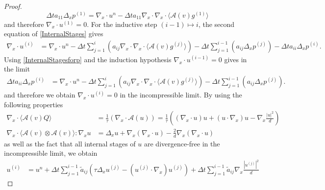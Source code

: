 \documentclass[10pt,a4paper]{amsart}
\begin{document}
\begin{proof}
\begin{equation}
\Delta t a_{11} \Delta_x p^{(1)} =  \nabla_x \cdot u^n - \Delta t  a_{11} \nabla_x \cdot \nabla_x \cdot \langle \mathcal{A}(v) g^{(1)} \rangle
\end{equation}
and therefore $\nabla_x \cdot u^{(1)} = 0$.
For the inductive step $(i-1) \mapsto i$, the second equation of \eqref{InternalStages} gives
\begin{equation}
\begin{split}
\nabla_x \cdot u^{(i)} &= \nabla_x \cdot u^n 
- \Delta t  \sum_{j = 1}^i \left( a_{ij} \nabla_x \cdot \nabla_x \cdot \langle \mathcal{A}(v) g^{(j)} \rangle \right) - \Delta t  \sum_{j = 1}^{i-1} \left( a_{ij} \Delta_x p^{(j)} \right) 
- \Delta t  a_{ii} \Delta_x p^{(i)}.
\end{split}
\end{equation}
Using \eqref{InternalStagesforp} and the induction hypothesis $\nabla_x \cdot u^{(i-1)} = 0$ gives in the limit 
\begin{equation}
\begin{split}
\Delta t a_{ii} \Delta_x p^{(i)}  &= \nabla_x \cdot  u^n - \Delta t  \sum_{j = 1}^i \left( a_{ij} \nabla_x \cdot \nabla_x \cdot \langle \mathcal{A}(v) g^{(j)} \rangle \right) - \Delta t  \sum_{j = 1}^{i-1} \left( a_{ij} \Delta_x p^{(j)} \right).
\end{split}
\end{equation}
and therefore we obtain $\nabla_x \cdot u^{(i)} = 0$ in the incompressible limit.
By using the following properties
\begin{equation*}\begin{split}
\nabla_x \cdot \langle \mathcal{A}(v) Q \rangle &= \frac{1}{\tau}\left( \nabla_x \cdot \mathcal{A}(u)\right) = \frac{1}{\tau} \left((\nabla_x \cdot u) u + (u \cdot \nabla_x) u - \nabla_x \frac{|u|^2}{d} \right)\\
\nabla_x \cdot \langle \mathcal{A}(v) \otimes \mathcal{A}(v) \rangle : \nabla_x u &= \Delta_x u + \nabla_x(\nabla_x \cdot u) - \frac{2}{d} \nabla_x (\nabla_x \cdot u)
\end{split}
\end{equation*}
as well as the fact that all internal stages of $u$ are divergence-free in the incompressible limit, we obtain
\begin{equation}
\begin{split} \label{FinalForu_}
u^{(i)} &= u^n 
+ \Delta t  \sum_{j=1}^{i-1} \tilde{a}_{ij}  \left( \tau \Delta_x u^{(j)} -  (u^{(j)} \cdot \nabla_x ) u^{(j)}\right) 
+ \Delta t  \sum_{j=1}^{i-1} \tilde{a}_{ij} \nabla_x \frac{|u^{(j)}|^2}{d} 

\end{split}
\end{equation}
\end{proof}
\end{document}
